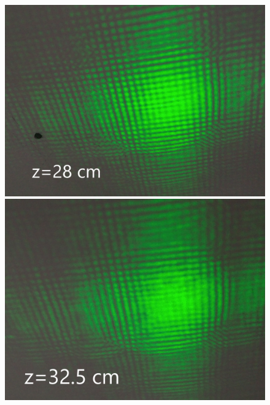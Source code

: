 \documentclass[a4paper,12pt]{article} %
\begin{document}
\begin{figure}[h]
\begin{center}
\begin{minipage}[h]{0.4\linewidth}
\includegraphics[width=1\linewidth]{47}
\caption{} %
\label{ris:experimoriginal} %
\end{minipage}
\hfill 
\begin{minipage}[h]{0.4\linewidth}
\includegraphics[width=1\linewidth]{48}
\caption{}
\label{ris:experimcoded}
\end{minipage}
\end{center}
\end{figure}  
\end{document}
